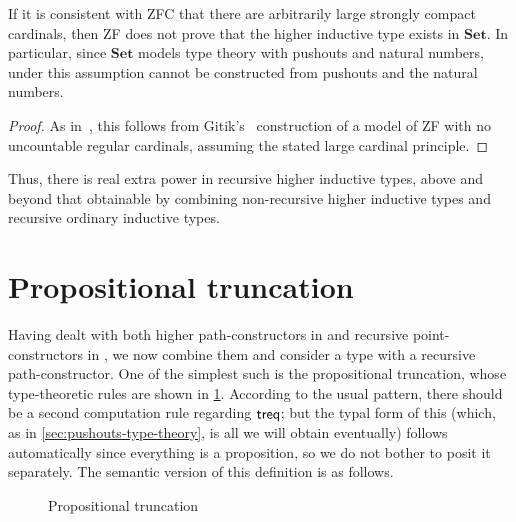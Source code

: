 \begin{enumerate}
\begin{cor}
  If it is consistent with ZFC that there are arbitrarily large strongly compact cardinals, then ZF does not prove that the higher inductive type \iF exists in $\mathbf{Set}$.
  In particular, since $\mathbf{Set}$ models type theory with pushouts and natural numbers, under this assumption \iF cannot be constructed from pushouts and the natural numbers.
\end{cor}
\begin{proof}
  As in~\cite[]{blass:freealg}, this follows from Gitik's~\cite{gitik:unc-sing} construction of a model of ZF with no uncountable regular cardinals, assuming the stated large cardinal principle.
\end{proof}

Thus, there is real extra power in recursive higher inductive types, above and beyond that obtainable by combining non-recursive higher inductive types and recursive ordinary inductive types.


\section{Propositional truncation}
\label{sec:prop-trunc}

Having dealt with both higher path-constructors in  and recursive point-constructors in , we now combine them and consider a type with a recursive path-constructor.
One of the simplest such is the propositional truncation, whose type-theoretic rules are shown in \cref{fig:proptrunc}.
According to the usual pattern, there should be a second computation rule regarding $\mathsf{treq}$; but the typal form of this (which, as in \cref{sec:pushouts-type-theory}, is all we will obtain eventually) follows automatically since everything is a proposition, so we do not bother to posit it separately.
The semantic version of this definition is as follows.

\begin{figure}
  \centering
  \caption{Propositional truncation}
  \label{fig:proptrunc}
\end{figure}


\end{enumerate}
